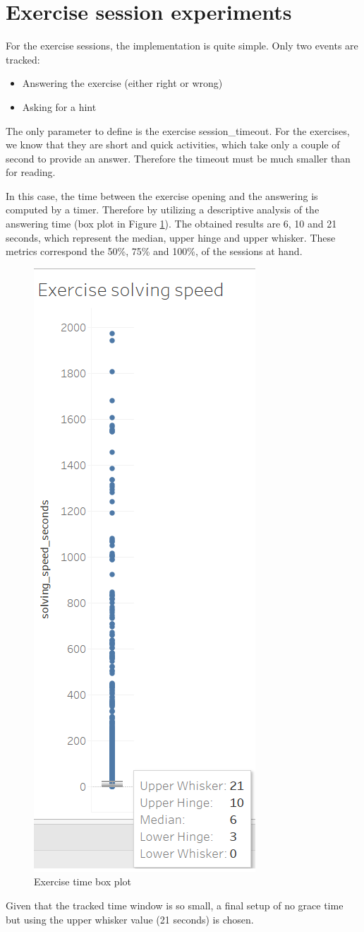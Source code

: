 \section{Exercise session experiments}
For the exercise sessions, the implementation is quite simple. Only two events are tracked:
\begin{itemize}
	\item Answering the exercise (either right or wrong)
	\item Asking for a hint
\end{itemize}

The only parameter to define is the exercise session\_timeout. For the exercises, we know that they are short and quick activities, which take only a couple of second to provide an answer. Therefore the timeout must be much smaller than for reading.

In this case, the time between the exercise opening and the answering is computed by a timer. Therefore by utilizing a descriptive analysis of the answering time (box plot in Figure \ref{fig:exercise_solving_speed}). The obtained results are 6, 10 and 21 seconds, which represent the median, upper hinge and upper whisker. These metrics correspond the 50\%, 75\% and 100\%, of the sessions at hand. 

\begin{figure}[bth]
	\centering
	\includegraphics[width=0.2\linewidth]{gfx/exercise_solving_speed}
	\caption{Exercise time box plot}\label{fig:exercise_solving_speed}
\end{figure}

Given that the tracked time window is so small, a final setup of no grace time but using the upper whisker value (21 seconds) is chosen.


